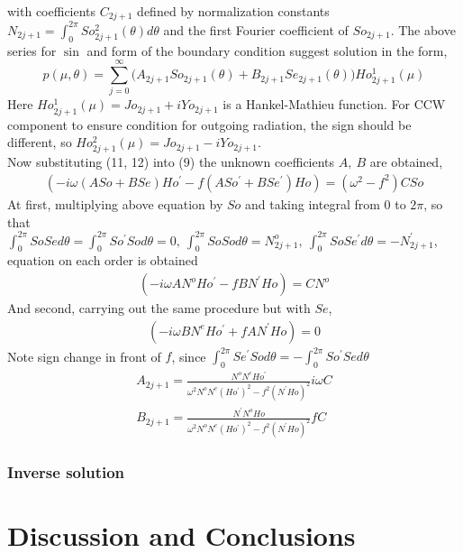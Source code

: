 with coefficients $C_{2j + 1}$ defined by normalization constants $N_{2j + 1} = \int_{0}^{2\pi} So_{2j + 1}^2(\theta) d \theta$ and the first Fourier coefficient of $So_{2j + 1}$. The above series for $\sin$ and form of the boundary condition suggest solution in the form,
\begin{equation}
p(\mu, \theta) = \sum_{j = 0}^{\infty} \big( A_{2j+1} So_{2j + 1}(\theta) + B_{2j+1} Se_{2j + 1}(\theta) \big) Ho^{1}_{2j + 1}(\mu)
\end{equation}
Here $Ho^{1}_{2j + 1}(\mu) = Jo_{2j + 1} + i Yo_{2j + 1}$ is a Hankel-Mathieu function. For CCW component to ensure condition for outgoing radiation, the sign should be different, so $Ho^{2}_{2j + 1}(\mu) = Jo_{2j + 1} - i Yo_{2j + 1}$.\\
Now substituting (11, 12) into (9) the unknown coefficients $A,~B$ are obtained,
\begin{align*}
(-i\omega (A So + B Se) Ho^{\prime} - f (A So^{\prime} + B Se^{\prime}) Ho) = (\omega^2 - f^2) C So
\end{align*}
At first, multiplying above equation by $So$ and taking integral from 0 to $2 \pi$, so that $\int_{0}^{2\pi} So Se d \theta = \int_0^{2 \pi} So^{\prime} So d \theta = 0,~\int_0^{2 \pi} So So d \theta = N^o_{2j + 1},~\int_0^{2 \pi} So Se^{\prime} d \theta = -N^{\prime}_{2j + 1}$, equation on each order is obtained
\begin{align*}
(-i \omega A N^o Ho^{\prime} - f B N^{\prime} Ho) = C N^o
\end{align*}
And second, carrying out the same procedure but with $Se$,
\begin{align*}
(-i \omega B N^e Ho^{\prime} + f A N^{\prime} Ho) = 0
\end{align*}
Note sign change in front of $f$, since $\int_0^{2\pi} Se^{\prime} So d \theta = -\int_0^{2\pi} So^{\prime} Se d \theta$
\begin{align}
A_{2j + 1} = \frac{N^o N^e Ho^{\prime}}{\omega^2 N^o N^e (Ho^{\prime})^2 - f^2 (N^{\prime} Ho)^2} i \omega  C\\
B_{2j + 1} = \frac{N^{\prime}  N^o Ho}{\omega^2 N^o N^e (Ho^{\prime})^2 - f^2 (N^{\prime} Ho)^2} f C
\end{align}
\subsubsection{Inverse solution}

\section{Discussion and Conclusions}

